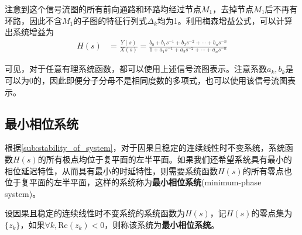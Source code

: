 \documentclass{ctexbook}
\begin{document}
注意到这个信号流图的所有前向通路和环路均经过节点$M_1$，去掉节点$M_1$后不再有环路，因此不含$M_1$的子图的特征行列式$\Delta_k$均为1。利用梅森增益公式，可以计算出系统增益为
\begin{align*}
    H(s)&=\frac{Y(s)}{X(s)}=\frac{b_0 + b_1 s^{-1} + b_2 s^{-2} + \cdots + b_n s^{-n}}{1 + a_1 s^{-1} + a_2 s^{-2} + \cdots + a_n s^{-n}}
\end{align*}

可见，对于任意有理系统函数，都可以使用上述信号流图表示。注意系数$a_k,b_k$是可以为0的，因此即便分子分母不是相同度数的多项式，也可以使用该信号流图表示。

\subsection{最小相位系统}\label{sub:min_phase}

根据\ref{sub:stability_of_system}，对于因果且稳定的连续线性时不变系统，系统函数$H(s)$的所有极点均位于复平面的左半平面。如果我们还希望系统具有最小的相位延迟特性，从而具有最小的时延特性，则需要系统函数$H(s)$的所有零点也位于复平面的左半平面，这样的系统称为\textbf{最小相位系统}(minimum-phase system)。

\begin{definition}[最小相位系统]
    设因果且稳定的连续线性时不变系统的系统函数为$H(s)$，记$H(s)$的零点集为$\{z_k\}$，如果$\forall k,\text{Re}(z_k)<0$，则称该系统为\textbf{最小相位系统}。
\end{definition}
\end{document}
